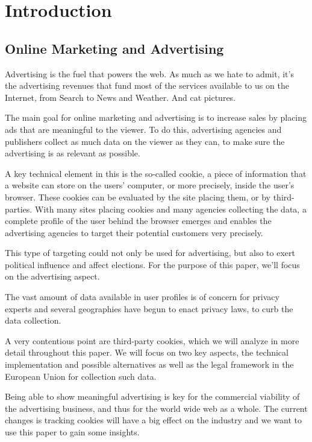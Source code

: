 %
%

\pagebreak
\section{Introduction}

\onehalfspacing

\subsection{Online Marketing and Advertising}

Advertising is the fuel that powers the web. As much as we hate to admit, it's the advertising revenues that fund most of the services available to us on the Internet, from Search to News and Weather. And cat pictures.

The main goal for online marketing and advertising is to increase sales by placing ads that are meaningful to the viewer. To do this, advertising agencies and publishers collect as much data on the viewer as they can, to make sure the advertising is as relevant as possible.

A key technical element in this is the so-called cookie, a piece of information that a website can store on the users' computer, or more precisely, inside the user's browser. These cookies can be evaluated by the site placing them, or by third-parties. With many sites placing cookies and many agencies collecting the data, a complete profile of the user behind the browser emerges and enables the advertising agencies to target their potential customers very precisely.

This type of targeting could not only be used for advertising, but also to exert political influence and affect elections. For the purpose of this paper, we'll focus on the advertising aspect.

The vast amount of data available in user profiles is of concern for privacy experts and several geographies have begun to enact privacy laws, to curb the data collection.

A very contentious point are third-party cookies, which we will analyze in more detail throughout this paper. We will focus on two key aspects, the technical implementation and possible alternatives as well as the legal framework in the European Union for collection such data.

Being able to show meaningful advertising is key for the commercial viability of the advertising business, and thus for the world wide web as a whole. The current changes is tracking cookies will have a big effect on the industry and we want to use this paper to gain some insights.

